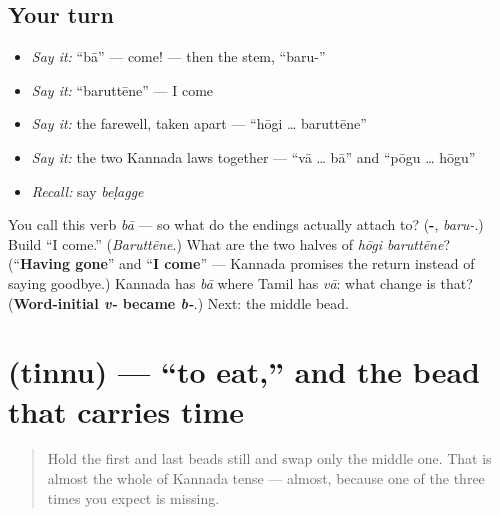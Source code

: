 \subsection*{Your turn}
\begin{itemize}
\raggedright
  \item \emph{Say it:} \textquotedblleft{}bā\textquotedblright{} — come! — then the stem, \textquotedblleft{}baru-\textquotedblright{}
  \item \emph{Say it:} \textquotedblleft{}baruttēne\textquotedblright{} — I come
  \item \emph{Say it:} the farewell, taken apart — \textquotedblleft{}hōgi … baruttēne\textquotedblright{}
  \item \emph{Say it:} the two Kannada laws together — \textquotedblleft{}vā … bā\textquotedblright{} and \textquotedblleft{}pōgu … hōgu\textquotedblright{}
  \item \emph{Recall:} say \emph{beḷagge}
\end{itemize}

\begin{tcolorbox}[breakable,colback=teal!4,colframe=teal!35!black,title={Before you move on}]
You call this verb \emph{bā} — so what do the endings actually attach to? (\textbf{-}, \emph{baru-}.) Build \textquotedblleft{}I come.\textquotedblright{} (\emph{Baruttēne}.) What are the two halves of \emph{hōgi baruttēne}? (\textquotedblleft{}\textbf{Having gone}\textquotedblright{} and \textquotedblleft{}\textbf{I come}\textquotedblright{} — Kannada promises the return instead of saying goodbye.) Kannada has \emph{bā} where Tamil has \emph{vā}: what change is that? (\textbf{Word-initial \emph{v-} became \emph{b-}}.) Next: the middle bead.
\end{tcolorbox}
\section[\texorpdfstring{\kn{ತಿನ್ನು} (tinnu)}{ತಿನ್ನು (tinnu)}]{ (tinnu) — \textquotedblleft{}to eat,\textquotedblright{} and the bead that carries time}

\label{lesson:KA-C32-tinnu}



\begin{quote}
Hold the first and last beads still and swap only the middle one. That is almost the whole of Kannada tense — almost, because one of the three times you expect is missing.
\end{quote}

